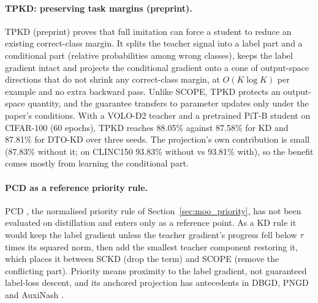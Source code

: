 \paragraph{TPKD: preserving task margins (preprint).}
TPKD \citep{yuan2026tpkd} (preprint) proves that full imitation can force a student to reduce an existing correct-class margin. It splits the teacher signal into a label part and a
conditional part (relative probabilities among wrong classes), keeps the label gradient intact and
projects the conditional gradient onto a cone of output-space
directions that do not shrink any correct-class margin, at $O(K\log K)$ per example and no extra
backward pass. Unlike SCOPE, TPKD protects an output-space quantity, and the guarantee transfers to parameter updates only under the paper's conditions. With a
VOLO-D2 teacher and a pretrained PiT-B student on CIFAR-100 (60 epochs), TPKD reaches
88.05\% against 87.58\% for KD and 87.81\% for DTO-KD over three seeds. The projection's own
contribution is small (87.83\% without it; on CLINC150 93.83\% without vs 93.81\% with), so the
benefit comes mostly from learning the conditional part.

\paragraph{PCD as a reference priority rule.}
PCD \citep{varam2026pcd}, the normalised priority rule of Section~\ref{sec:moo_priority}, has not
been evaluated on distillation and enters only as a reference point. As a KD rule it would keep the
label gradient unless the teacher gradient's progress fell below $\tau$ times its squared norm, then
add the smallest teacher component restoring it, which places it between SCKD (drop the term) and
SCOPE (remove the conflicting part). Priority means proximity to the label gradient, not guaranteed
label-loss descent, and its anchored projection has antecedents in DBGD, PNGD and AuxiNash
\citep{gong2021dbgd,ye2022pngd,shamsian2023auxinash}.

